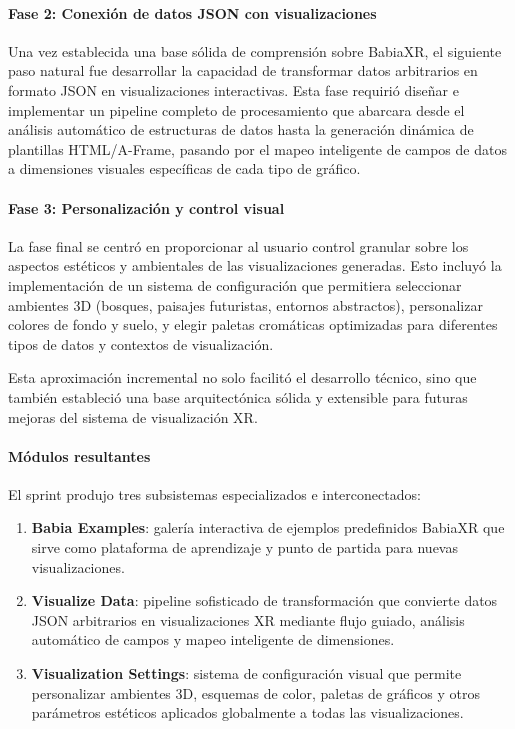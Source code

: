 \documentclass[a4paper, 12pt]{book}
\begin{document}
\paragraph{Fase 2: Conexión de datos JSON con visualizaciones}
Una vez establecida una base sólida de comprensión sobre BabiaXR, el siguiente paso natural fue desarrollar la capacidad de transformar datos arbitrarios en formato JSON en visualizaciones interactivas. Esta fase requirió diseñar e implementar un pipeline completo de procesamiento que abarcara desde el análisis automático de estructuras de datos hasta la generación dinámica de plantillas HTML/A-Frame, pasando por el mapeo inteligente de campos de datos a dimensiones visuales específicas de cada tipo de gráfico.

\paragraph{Fase 3: Personalización y control visual}
La fase final se centró en proporcionar al usuario control granular sobre los aspectos estéticos y ambientales de las visualizaciones generadas. Esto incluyó la implementación de un sistema de configuración que permitiera seleccionar ambientes 3D (bosques, paisajes futuristas, entornos abstractos), personalizar colores de fondo y suelo, y elegir paletas cromáticas optimizadas para diferentes tipos de datos y contextos de visualización.

Esta aproximación incremental no solo facilitó el desarrollo técnico, sino que también estableció una base arquitectónica sólida y extensible para futuras mejoras del sistema de visualización XR.

\paragraph{Módulos resultantes}
El sprint produjo tres subsistemas especializados e interconectados:
\begin{enumerate}
  \item \textbf{Babia Examples}: galería interactiva de ejemplos predefinidos BabiaXR que sirve como plataforma de aprendizaje y punto de partida para nuevas visualizaciones.
  \item \textbf{Visualize Data}: pipeline sofisticado de transformación que convierte datos JSON arbitrarios en visualizaciones XR mediante flujo guiado, análisis automático de campos y mapeo inteligente de dimensiones.
  \item \textbf{Visualization Settings}: sistema de configuración visual que permite personalizar ambientes 3D, esquemas de color, paletas de gráficos y otros parámetros estéticos aplicados globalmente a todas las visualizaciones.
\end{enumerate}
\end{document}
